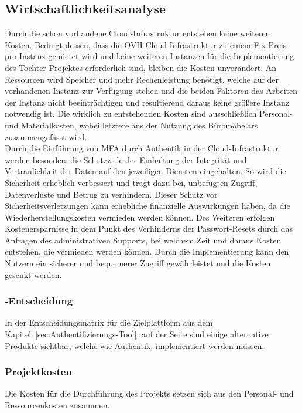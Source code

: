 \subsection{Wirtschaftlichkeitsanalyse}
\label{sec:Wirtschaftlichkeitsanalyse}
Durch die schon vorhandene Cloud-Infrastruktur entstehen keine weiteren Kosten. Bedingt dessen, dass die 
OVH-Cloud-Infrastruktur zu einem Fix-Preis pro Instanz gemietet wird und keine weiteren Instanzen für die Implementierung 
des Tochter-Projektes erforderlich sind, bleiben die Kosten unverändert. An Ressourcen wird Speicher und mehr 
Rechenleistung benötigt, welche auf der vorhandenen Instanz zur Verfügung stehen und die beiden Faktoren das Arbeiten 
der Instanz nicht beeinträchtigen und resultierend daraus keine größere Instanz notwendig ist. Die wirklich zu entstehenden 
Kosten sind ausschließlich Personal- und Materialkosten, wobei letztere aus der Nutzung des Büromöbelars zusammengefasst wird. 
\\Durch die Einführung von MFA durch Authentik in der Cloud-Infrastruktur werden besonders die Schutzziele der 
Einhaltung der Integrität und Vertraulichkeit der Daten auf den jeweiligen Diensten eingehalten. So wird die Sicherheit 
erheblich verbessert und trägt dazu bei, unbefugten Zugriff, Datenverluste und Betrug zu verhindern. Dieser Schutz 
vor Sicherheitsverletzungen kann erhebliche finanzielle Auswirkungen haben, da die Wiederherstellungskosten vermieden 
werden können. Des Weiteren erfolgen Kostenersparnisse in dem Punkt des Verhinderns der Passwort-Resets durch das Anfragen des 
administrativen Supports, bei welchem Zeit und daraus Kosten entstehen, die vermieden werden können. Durch die Implementierung 
kann den Nutzern ein sicherer und bequemerer Zugriff gewährleistet und die Kosten gesenkt werden.


\subsubsection{-Entscheidung}
\label{sec:MakeOrBuyEntscheidung}
In der Entscheidungsmatrix für die Zielplattform aus dem Kapitel~\ref{sec:Authentifizierungs-Tool}: 
auf der Seite \pageref{sec:Authentifizierungs-Tool} sind einige alternative Produkte sichtbar, welche wie Authentik, 
implementiert werden müssen.


\subsubsection{Projektkosten}
\label{sec:Projektkosten}
Die Kosten für die Durchführung des Projekts setzen sich aus den Personal- und Ressourcenkosten zusammen.   

